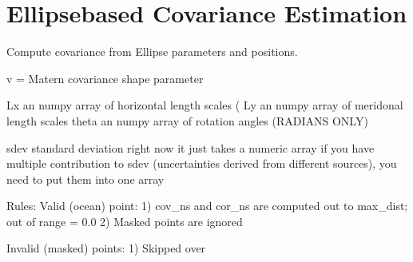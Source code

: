 \documentclass[letterpaper,10pt,english]{sphinxmanual}
\begin{document}
\section{Ellipse\sphinxhyphen{}based Covariance Estimation}
\label{\detokenize{ellipse:ellipse-based-covariance-estimation}}

\begin{fulllineitems}
\label{\detokenize{ellipse:glomar_gridding.ellipse.EllipseCovarianceBuilder}}
\pysigstartsignatures
\pysiglinewithargsret
{}
{\sphinxparamcomma {}\sphinxparamcomma {}\sphinxparamcomma {}\sphinxparamcomma {}\sphinxparamcomma {}\sphinxparamcomma {}\sphinxparamcomma {}\sphinxparamcomma {}\sphinxparamcomma {}\sphinxparamcomma {}\sphinxparamcomma {}}
{}
\pysigstopsignatures
\sphinxAtStartPar
Compute covariance from Ellipse parameters and positions.

\sphinxAtStartPar
v = Matern covariance shape parameter

\sphinxAtStartPar
Lx \sphinxhyphen{} an numpy array of horizontal length scales (
Ly \sphinxhyphen{} an numpy array of meridonal length scales
theta \sphinxhyphen{} an numpy array of rotation angles (RADIANS ONLY)

\sphinxAtStartPar
sdev \sphinxhyphen{} standard deviation \textendash{} right now it just takes a numeric array
if you have multiple contribution to sdev (uncertainties derived from
different sources), you need to put them into one array

\sphinxAtStartPar
Rules:
Valid (ocean) point:
1) cov\_ns and cor\_ns are computed out to max\_dist; out of range = 0.0
2) Masked points are ignored

\sphinxAtStartPar
Invalid (masked) points:
1) Skipped over


\end{fulllineitems}
\end{document}
